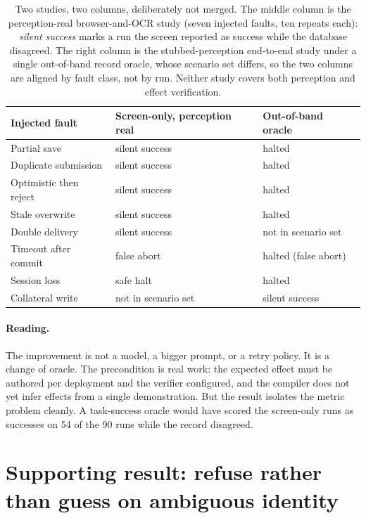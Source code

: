 \documentclass[10pt]{article}
\begin{document}
\begin{table}[t]
\centering
\caption{Two studies, two columns, deliberately not merged. The middle column is
the perception-real browser-and-OCR study (seven injected faults, ten repeats
each): \emph{silent success} marks a run the screen reported as success while
the database disagreed. The right column is the stubbed-perception end-to-end
study under a single out-of-band record oracle, whose scenario set differs, so
the two columns are aligned by fault class, not by run. Neither study covers
both perception and effect verification.}
\label{tab:faults}
\small
\begin{tabular}{lll}
\toprule
Injected fault & Screen-only, perception real & Out-of-band oracle \\
\midrule
Partial save            & \textcolor{oared}{silent success} & halted \\
Duplicate submission    & \textcolor{oared}{silent success} & halted \\
Optimistic then reject  & \textcolor{oared}{silent success} & halted \\
Stale overwrite         & \textcolor{oared}{silent success} & halted \\
Double delivery         & \textcolor{oared}{silent success} & not in scenario set \\
Timeout after commit    & false abort                        & halted (false abort) \\
Session loss            & safe halt                          & halted \\
Collateral write        & not in scenario set                & \textcolor{oared}{silent success} \\
\bottomrule
\end{tabular}
\end{table}

\paragraph{Reading.} The improvement is not a model, a bigger prompt, or a
retry policy. It is a change of oracle. The precondition is real work: the
expected effect must be authored per deployment and the verifier configured, and
the compiler does not yet infer effects from a single demonstration. But the
result isolates the metric problem cleanly. A task-success oracle would have
scored the screen-only runs as successes on 54 of the 90 runs while the record
disagreed.

\section{Supporting result: refuse rather than guess on ambiguous identity}
\label{sec:identity}
\end{document}

